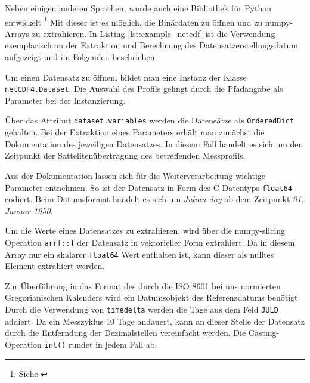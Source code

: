     Neben einigen anderen Sprachen, wurde auch eine Bibliothek für Python entwickelt \footnote{Siehe \cite{netCDF4}} Mit dieser ist es möglich, die Binärdaten zu öffnen und zu numpy-Arrays zu extrahieren. In Listing \ref{lst:example_netcdf} ist die Verwendung exemplarisch an der Extraktion und Berechnung des Datensatzerstellungsdatum aufgezeigt und im Folgenden beschrieben.
    
    
    Um einen Datensatz zu öffnen, bildet man eine Instanz der Klasse \texttt{netCDF4.Dataset}. Die Auswahl des Profils gelingt durch die Pfadangabe als Parameter bei der Instanzierung.
    
    Über das Attribut \texttt{dataset.variables} werden die Datensätze als \texttt{OrderedDict} gehalten. Bei der Extraktion eines Parameters erhält man zunächst die Dokumentation des jeweiligen Datensatzes. In diesem Fall handelt es sich um den Zeitpunkt der Sattelitenübertragung des betreffenden Messprofils.
    
    Aus der Dokumentation lassen sich für die Weiterverarbeitung wichtige Parameter entnehmen.
    So ist der Datensatz in Form des C-Datentyps \texttt{float64} codiert. Beim Datumsformat handelt es sich um \textit{Julian day} ab dem Zeitpunkt \textit{01. Januar 1950}.
    
    Um die Werte eines Datensatzes zu extrahieren, wird über die numpy-slicing Operation \texttt{arr[::]} der Datensatz in vektorieller Form extrahiert. Da in diesem Array nur ein skalarer \texttt{float64} Wert enthalten ist, kann dieser als nulltes Element extrahiert werden.
    
    Zur Überführung in das Format des durch die ISO 8601 bei uns normierten Gregorianischen Kalenders wird ein Datumsobjekt des Referenzdatums benötigt. Durch die Verwendung von \texttt{timedelta} werden die Tage aus dem Feld \texttt{JULD} addiert. Da ein Messzyklus 10 Tage andauert, kann an dieser Stelle der Datensatz durch die Entferndung der Dezimalstellen vereinfacht werden. Die Casting-Operation \texttt{int()} rundet in jedem Fall ab.
    


        

 
   
